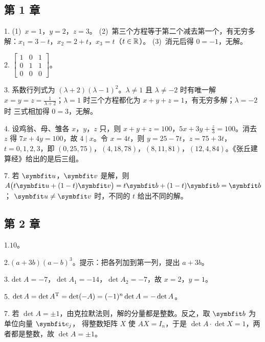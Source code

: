 
\begingroup
\small
\setlength\parindent{0pt}
\setlength\parskip{.35\baselineskip}

\subsection*{第 1 章}

{\mojingheadfont\color{mjAccent} 1.}\quad
(1)~$x=1$，$y=2$，$z=3$。\quad
(2)~第三个方程等于第二个减去第一个，有无穷多解：$x_1=3-t$，$x_2=2+t$，$x_3=t$（$t\in\mathbb{R}$）。\quad
(3)~消元后得 $0=-1$，无解。

{\mojingheadfont\color{mjAccent} 2.}\quad
$\begin{bmatrix}1&0&1\\0&1&1\\0&0&0\end{bmatrix}$。

{\mojingheadfont\color{mjAccent} 3.}\quad
系数行列式为 $(\lambda+2)(\lambda-1)^2$。$\lambda\ne1$ 且 $\lambda\ne-2$ 时有唯一解
$x=y=z=\frac{1}{\lambda+2}$；$\lambda=1$ 时三个方程都化为 $x+y+z=1$，有无穷多解；$\lambda=-2$ 时
三式相加得 $0=3$，无解。

{\mojingheadfont\color{mjAccent} 4.}\quad
设鸡翁、母、雏各 $x$，$y$，$z$ 只，则 $x+y+z=100$，$5x+3y+\frac{z}{3}=100$。消去 $z$ 得
$7x+4y=100$，故 $4\mid x$。令 $x=4t$，则 $y=25-7t$，$z=75+3t$，$t=0,1,2,3$，即
$(0,25,75)$，$(4,18,78)$，$(8,11,81)$，$(12,4,84)$。《张丘建算经》给出的是后三组。

{\mojingheadfont\color{mjAccent} 7.}\quad
若 $\vb{u}$，$\vb{v}$ 是解，则 $A\bigl(t\vb{u}+(1-t)\vb{v}\bigr)=t\vb{b}+(1-t)\vb{b}=\vb{b}$；
$\vb{u}\ne\vb{v}$ 时，不同的 $t$ 给出不同的解。

\subsection*{第 2 章}

{\mojingheadfont\color{mjAccent} 1.}\quad $10$。

{\mojingheadfont\color{mjAccent} 2.}\quad $(a+3b)(a-b)^3$。提示：把各列加到第一列，提出 $a+3b$。

{\mojingheadfont\color{mjAccent} 3.}\quad $\det A=-7$，$\det A_1=-14$，$\det A_2=-7$，故 $x=2$，$y=1$。

{\mojingheadfont\color{mjAccent} 5.}\quad
$\det A=\det A^{\mathrm{T}}=\det(-A)=(-1)^n\det A=-\det A$。

{\mojingheadfont\color{mjAccent} 7.}\quad
若 $\det A=\pm1$，由克拉默法则，解的分量都是整数。反之，取 $\vb{b}$ 为单位向量 $\vb{e}_j$，
得整数矩阵 $X$ 使 $AX=I_n$，于是 $\det A\cdot\det X=1$，两者都是整数，故 $\det A=\pm1$。
\endgroup
